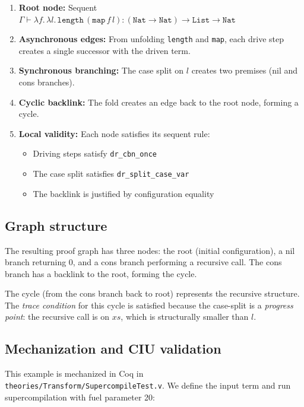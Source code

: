 \begin{enumerate}
\item \textbf{Root node:} Sequent $\Gamma \vdash \lambda f.\, \lambda l.\, \mathtt{length}\,(\mathtt{map}\,f\,l) : (\mathtt{Nat} \to \mathtt{Nat}) \to \mathtt{List} \to \mathtt{Nat}$

\item \textbf{Asynchronous edges:} From unfolding \texttt{length} and \texttt{map}, each drive step creates a single successor with the driven term.

\item \textbf{Synchronous branching:} The case split on $l$ creates two premises (nil and cons branches).

\item \textbf{Cyclic backlink:} The fold creates an edge back to the root node, forming a cycle.

\item \textbf{Local validity:} Each node satisfies its sequent rule:
\begin{itemize}
  \item Driving steps satisfy \texttt{dr\_cbn\_once}
  \item The case split satisfies \texttt{dr\_split\_case\_var}
  \item The backlink is justified by configuration equality
\end{itemize}
\end{enumerate}

\subsection{Graph structure}

The resulting proof graph has three nodes: the root (initial configuration), a nil branch returning 0, and a cons branch performing a recursive call. The cons branch has a backlink to the root, forming the cycle.

The cycle (from the cons branch back to root) represents the recursive structure. The \emph{trace condition} for this cycle is satisfied because the case-split is a \emph{progress point}: the recursive call is on $xs$, which is structurally smaller than $l$.

\subsection{Mechanization and CIU validation}

This example is mechanized in Coq in \texttt{theories/Transform/SupercompileTest.v}. We define the input term and run supercompilation with fuel parameter 20:

